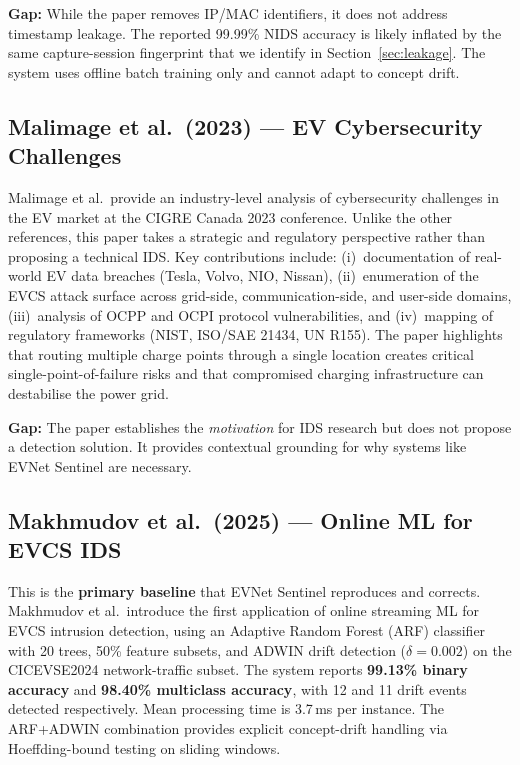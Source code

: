 \documentclass[conference]{IEEEtran}
\begin{document}
\textbf{Gap:} While the paper removes IP/MAC identifiers, it does not address timestamp leakage. The reported 99.99\% NIDS accuracy is likely inflated by the same capture-session fingerprint that we identify in Section~\ref{sec:leakage}. The system uses offline batch training only and cannot adapt to concept drift.

\subsection{Malimage et al.\ (2023) --- EV Cybersecurity Challenges \cite{b3}}

Malimage et al.\ provide an industry-level analysis of cybersecurity challenges in the EV market at the CIGRE Canada 2023 conference. Unlike the other references, this paper takes a strategic and regulatory perspective rather than proposing a technical IDS. Key contributions include: (i)~documentation of real-world EV data breaches (Tesla, Volvo, NIO, Nissan), (ii)~enumeration of the EVCS attack surface across grid-side, communication-side, and user-side domains, (iii)~analysis of OCPP and OCPI protocol vulnerabilities, and (iv)~mapping of regulatory frameworks (NIST, ISO/SAE 21434, UN R155). The paper highlights that routing multiple charge points through a single location creates critical single-point-of-failure risks and that compromised charging infrastructure can destabilise the power grid.

\textbf{Gap:} The paper establishes the \emph{motivation} for IDS research but does not propose a detection solution. It provides contextual grounding for why systems like EVNet Sentinel are necessary.

\subsection{Makhmudov et al.\ (2025) --- Online ML for EVCS IDS \cite{b4}}

This is the \textbf{primary baseline} that EVNet Sentinel reproduces and corrects. Makhmudov et al.\ introduce the first application of online streaming ML for EVCS intrusion detection, using an Adaptive Random Forest (ARF) classifier with 20 trees, 50\% feature subsets, and ADWIN drift detection ($\delta = 0.002$) on the CICEVSE2024 network-traffic subset. The system reports \textbf{99.13\% binary accuracy} and \textbf{98.40\% multiclass accuracy}, with 12 and 11 drift events detected respectively. Mean processing time is 3.7\,ms per instance. The ARF+ADWIN combination provides explicit concept-drift handling via Hoeffding-bound testing on sliding windows.
\end{document}
